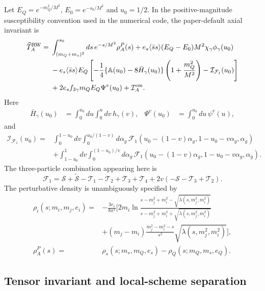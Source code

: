 \documentclass[11pt]{article}
\newcommand{\ssbar}{\langle\bar s s\rangle}
\begin{document}
Let $E_Q=e^{-m_Q^2/M^2}$, $E_0=e^{-s_0/M^2}$ and $u_0=1/2$.  In the
positive-magnitude susceptibility convention used in the numerical code, the
paper-default axial invariant is
\begin{align}
 \widehat T_A^{\rm RW}={}&
 \int_{(m_Q+m_s)^2}^{s_0}ds\,e^{-s/M^2}\rho_A^P(s)
 +e_s\ssbar(E_Q-E_0)M^2\chi_\gamma\phi_\gamma(u_0)\nonumber\\
 &-e_s\ssbar E_Q\left[
 -\frac14\{\mathbb A(u_0)-8\bar H_\gamma(u_0)\}
 \left(1+\frac{m_Q^2}{M^2}\right)
 -\mathcal I_{\mathcal F_1}(u_0)\right]\nonumber\\
 &+2e_sf_{3\gamma}m_QE_Q\Psi^v(u_0)
 +\mathcal I_A^{\rm em}.
 \label{eq:app-axial-invariant}
\end{align}
Here
\begin{align}
 \bar H_\gamma(u_0)&=\int_0^{u_0}du\int_0^u dv\,h_\gamma(v),&
 \Psi^v(u_0)&=\int_0^{u_0}du\,\psi^v(u),
\end{align}
and
\begin{align}
 \mathcal I_{\mathcal F_1}(u_0)={}&
 \int_0^{1-u_0}\!dv\int_0^{u_0/(1-v)}\!d\alpha_g\,
 \mathcal F_1(u_0-(1-v)\alpha_g,1-u_0-v\alpha_g,\alpha_g)
 \nonumber\\
 &+\int_{1-u_0}^{1}\!dv\int_0^{(1-u_0)/v}\!d\alpha_g\,
 \mathcal F_1(u_0-(1-v)\alpha_g,1-u_0-v\alpha_g,\alpha_g).
 \label{eq:app-f1-integral}
\end{align}
The three-particle combination appearing here is
\begin{equation}
 \mathcal F_1=\mathcal S+\widetilde{\mathcal S}
 -\mathcal T_1-\mathcal T_2+\mathcal T_3+\mathcal T_4
 +2v(-\mathcal S-\mathcal T_3+\mathcal T_2).
\end{equation}
The perturbative density is unambiguously specified by
\begin{align}
 \rho_i(s;m_i,m_j,e_i)={}&-\frac{3e_i}{8\pi^2}
 \Bigg[2m_i\ln\frac{s-m_j^2+m_i^2-\sqrt{\lambda(s,m_j^2,m_i^2)}}
 {s-m_j^2+m_i^2+\sqrt{\lambda(s,m_j^2,m_i^2)}}\nonumber\\
 &+(m_j-m_i)\frac{m_j^2-m_i^2-s}{s^2}
 \sqrt{\lambda(s,m_j^2,m_i^2)}\Bigg],\nonumber\\
 \rho_A^P(s)={}&\rho_s(s;m_s,m_Q,e_s)-\rho_Q(s;m_Q,m_s,e_Q).
 \label{eq:app-rho-a}
\end{align}

\subsection{Tensor invariant and local-scheme separation}
\end{document}
